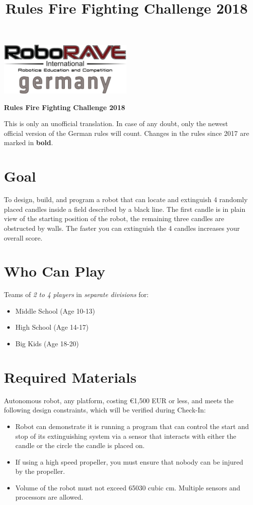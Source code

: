 \documentclass[a4paper,12pt]{article}
\begin{document}
\title{Rules Fire Fighting Challenge 2018}

 \begin{center}
\includegraphics[width=0.5\textwidth]{logo.png}

\huge                      %
\bfseries                   %
Rules Fire Fighting Challenge 2018
  \end{center}
  This is only an unofficial translation. In case of any doubt, only the newest official version of the German rules will
  count. Changes in the rules since 2017 are marked in \textbf{bold}.
\section{Goal}
To design, build, and program a robot that can locate and extinguish 4 randomly placed candles inside a field
described by a black line. The first candle is in plain view of the starting position of the robot, the remaining
three candles are obstructed by walls. The faster you can extinguish the 4 candles increases your overall
score.
\section{Who Can Play}
Teams of \emph{2 to 4 players} in \emph{separate divisions} for:
\begin{itemize}
	\item Middle School (Age 10-13)
	\item High School (Age 14-17)
	\item Big Kids (Age 18-20)
\end{itemize}
\section{Required Materials}
Autonomous robot, any platform, costing €1,500 EUR or less, and meets the following design constraints,
which will be verified during Check-In:
\begin{itemize}
\item Robot can demonstrate it is running a program that can control the start and stop of its extinguishing system
via a sensor that interacts with either the candle or the circle the candle is placed on.
\item If using a high speed propeller, you must ensure that nobody can be injured by the propeller.
\item Volume of the robot must not exceed 65030 cubic cm. Multiple sensors and processors are allowed.
\end{itemize}
\end{document}
